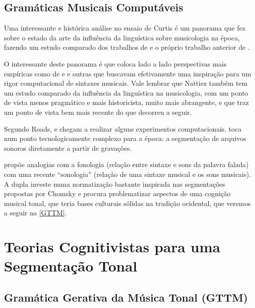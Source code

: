 \documentclass[
	12pt,				%
	openright,			%
	twoside,			%
	a4paper,			%
	english,			%
	french,				%
	spanish,			%
	brazil				%
	]{abntex2}
\begin{document}
\section{Gramáticas Musicais Computáveis}

Uma interessante e histórica análise no ensaio de Curtis  é um panorama que fez sobre o estado da arte da influência da linguística sobre musicologia na época, fazendo um estudo comparado dos trabalhos de  e o próprio trabalho anterior de .


O interessante deste panorama é que coloca lado a lado perspectivas mais empíricas como de  e  e outras que buscavam efetivamente uma inspiração para um rigor computacional de sintaxes musicais. Vale lembrar que Nattiez também tem um estudo comparado da influência da linguística na musicologia, com um ponto de vista menos pragmático e mais historicista, muito mais abrangente, e que traz um ponto de vista bem mais recente \cite{nattiez2004modelos} do que decorreu a seguir.


Segundo Roads,  e  chegam a realizar alguns experimentos computacionais.  toca num ponto tecnologicamente complexo para a época: a segmentação de arquivos sonoros diretamente a partir de gravações. 

 propõe analogias com a fonologia (relação entre sintaxe e sons da palavra falada) com uma recente “sonologia” (relação de uma sintaxe musical e os sons musicais). A dupla   investe numa normatização bastante inspirada nas segmentações propostas por Chomsky e procura problematizar aspectos de uma cognição musical tonal, que teria bases culturais sólidas na tradição ocidental, que veremos a seguir na \autoref{GTTM}.



\chapter{Teorias Cognitivistas para uma Segmentação Tonal}

\section{Gramática Gerativa da Música Tonal (GTTM)}
\label{GTTM}
\end{document}
